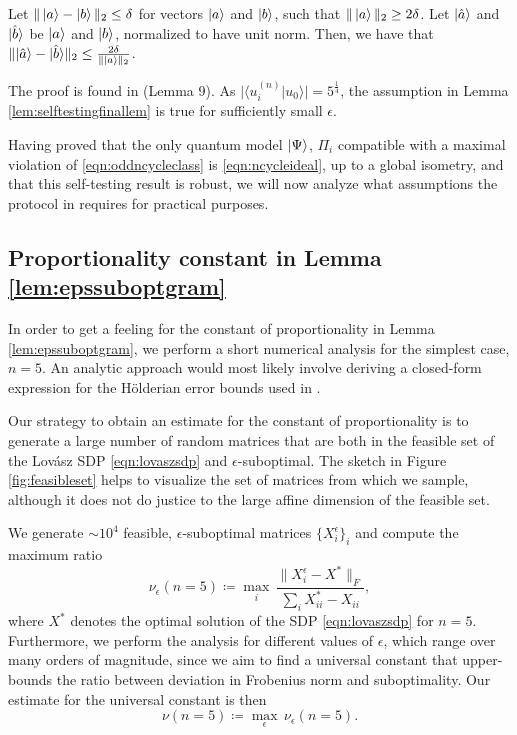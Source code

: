 \begin{lemma}
\label{lem:selftestingfinallem}
Let $\| \ket{a} - \ket{b} \|_2\leq\delta$ for vectors $\ket{a}$ and $\ket{b}$, such that $\|\ket{a}\|_2\geq2\delta$. Let $\vert \Hat{a} \rangle$ and $\vert \Hat{b} \rangle$ be $\ket{a}$ and $\ket{b}$, normalized to have unit norm. Then, we have that $\| \vert \Hat{a}\rangle-\vert \Hat{b} \rangle \|_2\leq \frac{2\delta}{\|\ket{a}\|_2}$.
\end{lemma}
The proof is found in \cite{Bharti2019} (Lemma 9). As $\vert \langle u_i^{(n)}\vert u_0 \rangle \vert =5^{\frac{1}{4}}$, the assumption in Lemma \ref{lem:selftestingfinallem} is true for sufficiently small $\epsilon$.

Having proved that the only quantum model $\ket{\Psi}$, $\Pi_i$ compatible with a maximal violation of \ref{eqn:oddncycleclass} is \ref{eqn:ncycleideal}, up to a global isometry, and that this self-testing result is robust, we will now analyze what assumptions the protocol in \cite{Bharti2019} requires for practical purposes.

\subsection{Proportionality constant in Lemma \ref{lem:epssuboptgram}}
\label{sec:propconst}

In order to get a feeling for the constant of proportionality in Lemma \ref{lem:epssuboptgram}, we perform a short numerical analysis for the simplest case, $n=5$. An analytic approach would most likely involve deriving a closed-form expression for the Hölderian error bounds used in \cite{Bharti2019}.

Our strategy to obtain an estimate for the constant of proportionality is to generate a large number of random matrices that are both in the feasible set of the Lovász SDP \ref{eqn:lovaszsdp} and $\epsilon$-suboptimal. The sketch in Figure \ref{fig:feasibleset} helps to visualize the set of matrices from which we sample, although it does not do justice to the large affine dimension of the feasible set. 


We generate $\sim 10^4$ feasible, $\epsilon$-suboptimal matrices $\{X_i^{\epsilon}\}_i$ and compute the maximum ratio 
\begin{equation*}
\nu_{\epsilon}(n=5)\coloneqq \max_i \, \frac{\|X_i^{\epsilon}-X^{*}\|_F}{\sum_i X^{*}_{ii}-X_{ii}},
\end{equation*}
where $X^{*}$ denotes the optimal solution of the SDP \ref{eqn:lovaszsdp} for $n=5$.
Furthermore, we perform the analysis for different values of $\epsilon$, which range over many orders of magnitude, since we aim to find a universal constant that upper-bounds the ratio between deviation in Frobenius norm and suboptimality. Our estimate for the universal constant is then
\begin{equation*}
\nu(n=5)\coloneqq \max_{\epsilon}\, \nu_{\epsilon}(n=5).
\end{equation*}

